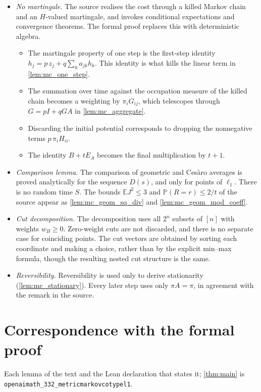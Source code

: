 \documentclass[11pt]{article}
\theoremstyle{definition}
\theoremstyle{remark}
\begin{document}
\begin{itemize}
\item \emph{No martingale.} The source realises the cost through a killed Markov chain and an $H$-valued martingale, and invokes conditional expectations and convergence theorems. The formal proof replaces this with deterministic algebra.
\begin{itemize}
\item The martingale property of one step is the first-step identity $h_j=p\,z_j+q\sum_ka_{jk}h_k$. This identity is what kills the linear term in \cref{lem:mc_one_step}.
\item The summation over time against the occupation measure of the killed chain becomes a weighting by $\pi_iG_{ij}$, which telescopes through $G=pI+qGA$ in \cref{lem:mc_aggregate}.
\item Discarding the initial potential corresponds to dropping the nonnegative terms $p\,\pi_iH_{ii}$.
\item The identity $B+tE_A$ becomes the final multiplication by $t+1$.
\end{itemize}
\item \emph{Comparison lemma.} The comparison of geometric and Ces\`aro averages is proved analytically for the sequence $D(s)$, and only for points of $\ell_1$. There is no random time $S$. The bounds $\mathbb E J^2\le3$ and $\mathbb P(R=r)\le2/t$ of the source appear as \cref{lem:mc_geom_sq_div} and \cref{lem:mc_geom_mod_coeff}.
\item \emph{Cut decomposition.} The decomposition uses all $2^n$ subsets of $[n]$ with weights $w_B\ge0$. Zero-weight cuts are not discarded, and there is no separate case for coinciding points. The cut vectors are obtained by sorting each coordinate and making a choice, rather than by the explicit min--max formula, though the resulting nested cut structure is the same.
\item \emph{Reversibility.} Reversibility is used only to derive stationarity (\cref{lem:mc_stationary}). Every later step uses only $\pi A=\pi$, in agreement with the remark in the source.
\end{itemize}

\appendix
\section{Correspondence with the formal proof}
Each lemma of the text and the Lean declaration that states it; \cref{thm:main} is \texttt{openaimath\_332\_metricmarkovcotypel1}.
\end{document}

